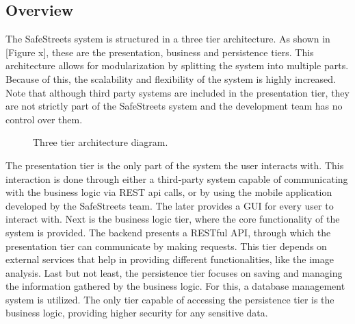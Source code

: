 \subsection{Overview}

The SafeStreets system is structured in a three tier architecture. As shown in [Figure x], these are the presentation, business and persistence tiers. This architecture allows for modularization by splitting the system into multiple parts. Because of this, the scalability and flexibility of the system is highly increased.
Note that although third party systems are included in the presentation tier, they are not strictly part of the SafeStreets system and the development team has no control over them.

\begin{figure}[H]
\centering
{}
\caption{\label{fig:3-tiers}Three tier architecture diagram.}
\end{figure}

The presentation tier is the only part of the system the user interacts with. This interaction is done through either a third-party system capable of communicating with the business logic via REST api calls, or by using the mobile application developed by the SafeStreets team. The later provides a GUI for every user to interact with.
Next is the business logic tier, where the core functionality of the system is provided. The backend presents a RESTful API, through which the presentation tier can communicate by making requests. This tier depends on external services that help in providing different functionalities, like the image analysis.
Last but not least, the persistence tier focuses on saving and managing the information gathered by the business logic. For this, a database management system is utilized. The only tier capable of accessing the persistence tier is the business logic, providing higher security for any sensitive data.

